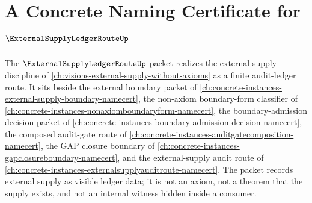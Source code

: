 \chapter{A Concrete Naming Certificate for $\ExternalSupplyLedgerRouteUp$}
\label{ch:concrete-instances-external-supply-ledger-route-namecert}

The $\ExternalSupplyLedgerRouteUp$ packet realizes the external-supply discipline of \autoref{ch:visions-external-supply-without-axioms} as a finite audit-ledger route. It sits beside the external boundary packet of \autoref{ch:concrete-instances-external-supply-boundary-namecert}, the non-axiom boundary-form classifier of \autoref{ch:concrete-instances-nonaxiomboundaryform-namecert}, the boundary-admission decision packet of \autoref{ch:concrete-instances-boundary-admission-decision-namecert}, the composed audit-gate route of \autoref{ch:concrete-instances-auditgatecomposition-namecert}, the GAP closure boundary of \autoref{ch:concrete-instances-gapclosureboundary-namecert}, and the external-supply audit route of \autoref{ch:concrete-instances-externalsupplyauditroute-namecert}. The packet records external supply as visible ledger data; it is not an axiom, not a theorem that the supply exists, and not an internal witness hidden inside a consumer.

